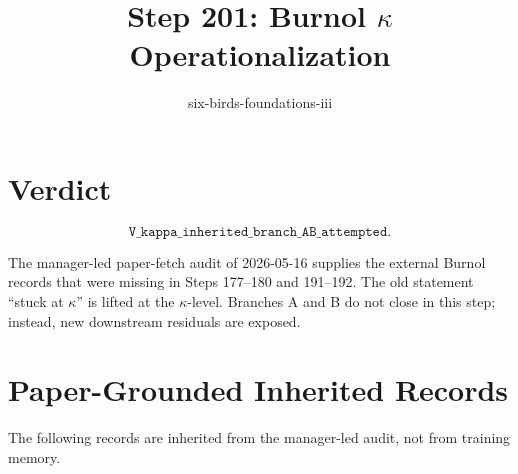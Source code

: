\documentclass[11pt]{article}
\title{Step 201: Burnol \(\kappa\) Operationalization}
\author{six-birds-foundations-iii}
\date{}
\begin{document}
\maketitle

\section*{Verdict}

\[
\boxed{\texttt{V\_kappa\_inherited\_branch\_AB\_attempted}.}
\]

The manager-led paper-fetch audit of 2026-05-16 supplies the external Burnol
records that were missing in Steps 177--180 and 191--192.  The old statement
``stuck at \(\kappa\)'' is lifted at the \(\kappa\)-level.  Branches A and B
do not close in this step; instead, new downstream residuals are exposed.

\section*{Paper-Grounded Inherited Records}

The following records are inherited from the manager-led audit, not from
training memory.
\end{document}
